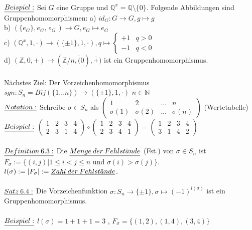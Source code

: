 \documentclass[fleqn, a4paper, 11pt]{scrartcl}
\newcommand{\NN}{\mathbb{N}}
\newcommand{\ZZ}{\mathbb{Z}}
\newcommand{\QQ}{\mathbb{Q}}
\theoremstyle{definition}
\begin{document}
\\
$\uline{Beispiel:}$ Sei $G$ eine Gruppe und $\QQ^x=\QQ\setminus\{0\}$. Folgende Abbildungen sind Gruppenhomomorphismen: a) $id_G:G\rightarrow G,g\mapsto g$\\
b) $(\{e_G\},e_G,\circ_G)\rightarrow G,e_G\mapsto e_G$\\
c) $(\QQ^x,1,\cdot)\rightarrow(\{\pm 1\},1,\cdot),q\mapsto
\begin{cases}
	+1 & q>0\\
	-1 & q<0
\end{cases}$\\
d) $(\ZZ,0,+)\rightarrow(\ZZ/n,\overline(0),\overline{+})$ ist ein Gruppenhomomorphismus.\\
\\
Nächstes Ziel: Der Vorzeichenhomomorphismus $sgn:S_n=Bij(\{1...n\})\rightarrow(\{\pm 1\},1,\cdot)$ $n\in\NN$\\
$\uline{Notation:}$ Schreibe $\sigma\in S_n$ als 
$\begin{pmatrix}
	1 & 2 & \dots & n\\
	\sigma(1) & \sigma(2) & \dots & \sigma(n)
\end{pmatrix}$ (Wertetabelle)\\
$\uline{Beispiel:}$ $\begin{pmatrix}
	1 & 2 & 3 & 4\\
	2 & 3 & 1 & 4
\end{pmatrix} \circ
\begin{pmatrix}
	1 & 2 & 3 & 4\\
	2 & 3 & 4 & 1
\end{pmatrix} =
\begin{pmatrix}
	1 & 2 & 3 & 4\\
	3 & 1 & 4 & 2
\end{pmatrix}$\\
\\
$\uline{Definition\:6.3:}$ Die $\uline{Menge\:der\:Fehlst\ddot{a}nde}$ (Fst.) von $\sigma\in S_n$ ist $F_\sigma:=\{(i,j)|1\leq i<j\leq n$ und $\sigma(i)>\sigma(j)\}$. $l(\sigma):=|F_\sigma |:=\uline{Zahl\:der\:Fehlst\ddot{a}nde}$.\\
\\
$\uline{Satz\:6.4:}$ Die Vorzeichenfunktion $\sigma:S_n\rightarrow\{\pm 1\},\sigma\mapsto (-1)^{l(\sigma)}$ ist ein Gruppenhomomorphismus.\\
\\
$\uline{Beispiel:}$ $l(\sigma)=1+1+1=3$ , $F_\sigma=\{(1,2),(1,4),(3,4)\}$\\
\\
\end{document}
